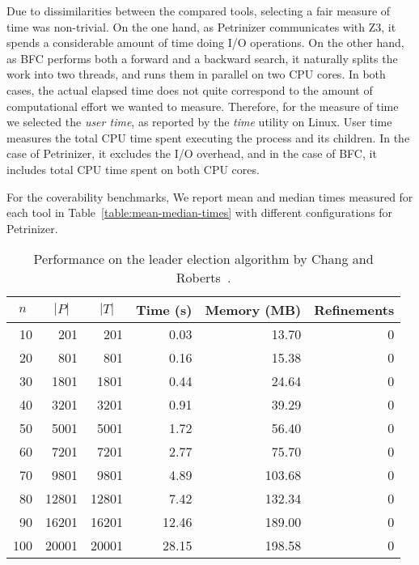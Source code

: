 Due to dissimilarities between the compared tools, selecting a fair
measure of time was non-trivial. On the one hand, as
Petrinizer communicates with Z3, it spends a
considerable amount of time doing I/O operations.
On the other hand,
as BFC performs both a forward and a backward search, it naturally
splits the work into two threads, and runs them in parallel on two CPU
cores. In both cases, the actual elapsed time does not quite
correspond to the amount of computational effort we wanted to measure.
Therefore, for the measure of time we selected the \emph{user time},
as reported by the \emph{time} utility on Linux. User time measures
the total CPU time spent executing the process and its children. In
the case of Petrinizer, it excludes the I/O overhead, and in the case
of BFC, it includes total CPU time spent on both CPU cores.

For the coverability benchmarks, We report mean and median times measured for each tool in
Table~\ref{table:mean-median-times} with different configurations for Petrinizer.

\begin{table}[t]
  \centering
  \caption{Performance on the leader election algorithm by Chang and Roberts~\cite{ChangRoberts79}.}
\label{table:performance-leader-election}
    \begin{tabular}{rrrrrr}
    \toprule
    \multicolumn{1}{c}{$n$} &
    \multicolumn{1}{c}{$|P|$} &
    \multicolumn{1}{c}{$|T|$} &
    \multicolumn{1}{c}{Time (s)} &
    \multicolumn{1}{c}{Memory (MB)} &
    \multicolumn{1}{c}{Refinements} \\
    \midrule
     10 &   201 &   201 &  0.03 &  13.70 & 0 \\
     20 &   801 &   801 &  0.16 &  15.38 & 0 \\
     30 &  1801 &  1801 &  0.44 &  24.64 & 0 \\
     40 &  3201 &  3201 &  0.91 &  39.29 & 0 \\
     50 &  5001 &  5001 &  1.72 &  56.40 & 0 \\
     60 &  7201 &  7201 &  2.77 &  75.70 & 0 \\
     70 &  9801 &  9801 &  4.89 & 103.68 & 0 \\
     80 & 12801 & 12801 &  7.42 & 132.34 & 0 \\
     90 & 16201 & 16201 & 12.46 & 189.00 & 0 \\
    100 & 20001 & 20001 & 28.15 & 198.58 & 0 \\
    \bottomrule
  \end{tabular}
\end{table}

